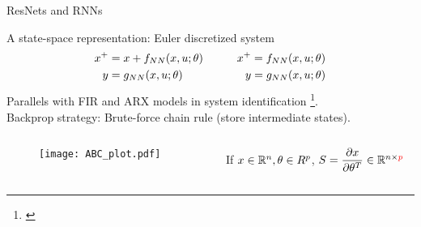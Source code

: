 \documentclass[dvipsnames, 9pt]{beamer}
\begin{document}
\begin{frame}{ResNets and RNNs}
    \begin{block}{A state-space representation: Euler discretized system}
    \begin{align*}
        x^+ &= x + f_{NN} (x, u; \theta) &\qquad x^+ = f_{NN} (x, u; \theta)\notag \\ 
        y &= g_{NN} (x, u; \theta) &\qquad y = g_{NN} (x, u; \theta)
        \label{eq:resrnn}
    \end{align*}
    Parallels with FIR and ARX models in system identification \footnote[frame]{\cite{ljung:1999}}.\\
    Backprop strategy: Brute-force chain rule (store intermediate states).
    \end{block}
    \begin{columns}
    {\begin{column}{0.6\textwidth}
    \begin{figure}
        \centering
        \texttt{[image: ABC\_plot.pdf]}
    \end{figure}
\end{column}}
{\begin{column}{0.3\textwidth}
    \ If $x\in\mathbb{R}^n, \theta\in R^p$, $S = \dfrac{\partial x}{\partial \theta^T}\in\mathbb{R}^{n\times \textcolor{red}{p}}$
\end{column}}
\end{columns}
\end{frame}
\end{document}
